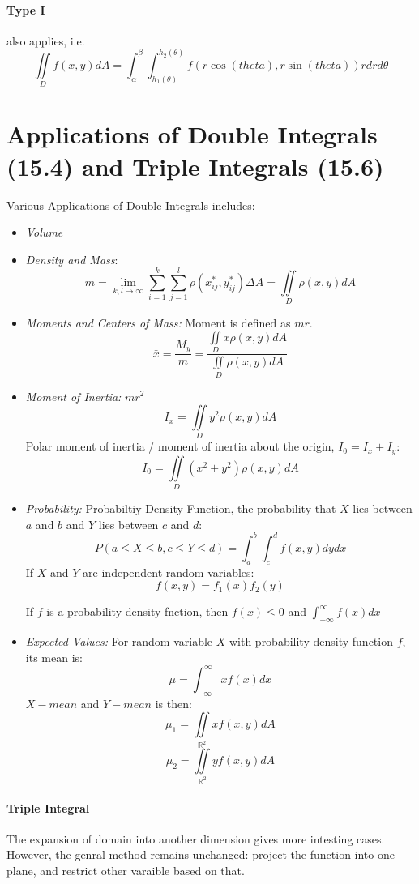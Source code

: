 \documentclass[11pt, oneside]{article}   	%
\begin{document}
\paragraph{Type I} also applies, i.e.
$$\iint \limits_D f(x,y) dA = \int_\alpha^\beta \int_{h_1(\theta)}^{h_2(\theta)} f(r\cos(theta), r\sin(theta))rdrd\theta$$


\section{Applications of Double Integrals (15.4) and Triple Integrals (15.6)}
Various Applications of Double Integrals includes:
\begin{itemize}
\item{\emph{Volume}}
\item{\emph{Density and Mass}: $$m = \lim_{k,l\to\infty}\sum_{i=1}^k\sum_{j=1}^l\rho(x_{ij}^\ast, y_{ij}^\ast)\Delta A = \iint \limits_D \rho(x,y)dA$$
}
\item{\emph{Moments and Centers of Mass:} Moment is defined as $mr$.
$$\bar{x} = \frac{M_y}{m} = \frac{\iint \limits_D x\rho (x,y)dA}{\iint \limits_D \rho (x,y)dA}$$
}
\item{\emph{Moment of Inertia:} $mr^2$
$$I_x = \iint \limits_D y^2 \rho(x,y) dA$$
Polar moment of inertia / moment of inertia about the origin, $I_0 = I_x + I_y$: $$I_0 = \iint \limits_D (x^2 + y^2)\rho(x,y) dA$$
}
\item{\emph{Probability:} Probabiltiy Density Function, the probability that $X$ lies between $a$ and $b$ and $Y$ lies between $c$ and $d$: $$P(a \leq X \leq b, c \leq Y \leq d) = \int_a^b \int_c^d f(x,y) dy dx$$
If $X$ and $Y$ are independent random variables: $$f(x,y)=f_1(x)f_2(y)$$
\par
If $f$ is a probability density fnction, then $f(x)\leq0$ and $\int_{-\infty}^{\infty}f(x)dx$
}
\item{\emph{Expected Values:}
For random variable $X$ with probability density function $f$, its mean is: $$\mu = \int_{-\infty}^\infty xf(x)dx$$
$X-mean$ and $Y-mean$ is then: $$\mu_1 = \iint \limits_{\mathbb{R}^2} xf(x, y)dA$$
$$\mu_2 = \iint \limits_{\mathbb{R}^2} yf(x, y)dA$$

}
\end{itemize}
\paragraph{Triple Integral}
The expansion of domain into another dimension gives more intesting cases. However, the genral method remains unchanged: project the function into one plane, and restrict other varaible based on that.
\end{document}
